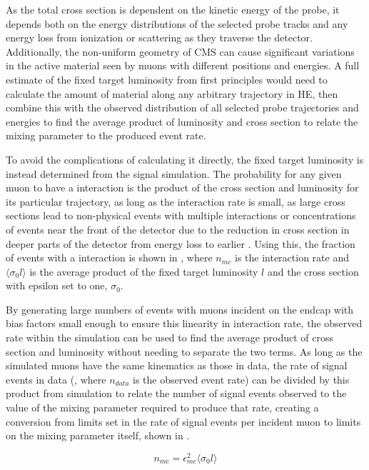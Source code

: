 As the total cross section is dependent on the kinetic energy of the probe, it depends both on the energy distributions of the selected probe tracks and any energy loss from ionization or scattering as they traverse the detector.
Additionally, the non-uniform geometry of CMS can cause significant variations in the active material seen by muons with different positions and energies. 
A full estimate of the fixed target luminosity from first principles would need to calculate the amount of material along any arbitrary trajectory in HE, then combine this with the observed distribution of all selected probe trajectories and energies to find the average product of luminosity and cross section to relate the mixing parameter to the produced event rate.

To avoid the complications of calculating it directly, the fixed target luminosity is instead determined from the signal simulation.
The probability for any given muon to have a \dbrem interaction is the product of the cross section and luminosity for its particular trajectory, as long as the interaction rate is small, as large cross sections lead to non-physical events with multiple \dbrem interactions or concentrations of \dbrem events near the front of the detector due to the reduction in cross section in deeper parts of the detector from energy loss to earlier \dbrem. 
Using this, the fraction of events with a \dbrem interaction is shown in , where $n_{mc}$ is the interaction rate and $\langle \sigma_0 l \rangle$ is the average product of the fixed target luminosity $l$ and the cross section with epsilon set to one, $\sigma_0$.  

By generating large numbers of events with muons incident on the endcap with bias factors small enough to ensure this linearity in interaction rate, the observed rate within the simulation can be used to find the average product of cross section and luminosity without needing to separate the two terms.
As long as the simulated muons have the same kinematics as those in data, the rate of signal events in data (, where $n_{data}$ is the observed event rate) can be divided by this product from simulation to relate the number of signal events observed to the value of the mixing parameter required to produce that rate, creating a conversion from limits set in the rate of signal events per incident muon to limits on the mixing parameter itself, shown in .

\begin{equation}
	\label{eq:mcrate}
	n_{mc} = \epsilon_{mc}^2 \langle \sigma_0 l \rangle
\end{equation}

